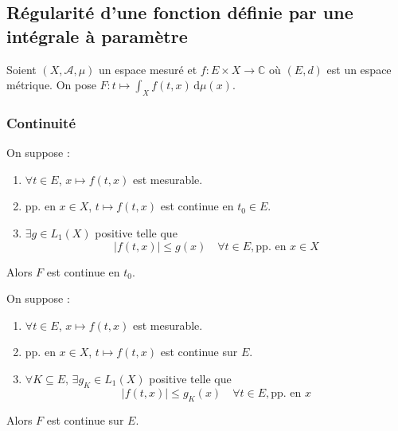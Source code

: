 




  \subsection{Régularité d'une fonction définie par une intégrale à paramètre}

  Soient $(X, \mathcal{A}, \mu)$ un espace mesuré et $f : E \times X \rightarrow \mathbb{C}$ où $(E, d)$ est un espace métrique. On pose $F : t \mapsto \int_X f(t, x) \, \mathrm{d}\mu(x)$.

  \subsubsection{Continuité}


  \begin{theorem}
    On suppose :
    \begin{enumerate}[label=(\roman*)]
      \item $\forall t \in E$, $x \mapsto f(t,x)$ est mesurable.
      \item pp. en $x \in X$, $t \mapsto f(t,x)$ est continue en $t_0 \in E$.
      \item $\exists g \in L_1(X)$ positive telle que
      \[ |f(t,x)| \leq g(x) \quad \forall t \in E, \text{pp. en } x \in X \]
    \end{enumerate}
    Alors $F$ est continue en $t_0$.
  \end{theorem}

  \begin{corollary}
    On suppose :
    \begin{enumerate}[label=(\roman*)]
      \item $\forall t \in E$, $x \mapsto f(t,x)$ est mesurable.
      \item pp. en $x \in X$, $t \mapsto f(t,x)$ est continue sur $E$.
      \item $\forall K \subseteq E, \, \exists g_K \in L_1(X)$ positive telle que
      \[ |f(t,x)| \leq g_K(x) \quad \forall t \in E, \text{pp. en } x \]
    \end{enumerate}
    Alors $F$ est continue sur $E$.
  \end{corollary}


